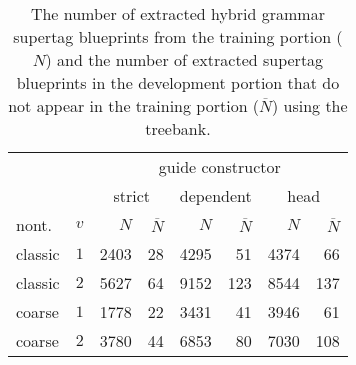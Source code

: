 \documentclass[../../document.tex]{subfiles}
\begin{document}
    \begin{table}
        \caption{\label{tbl:experiments:dptb:size}
        The number of extracted hybrid grammar supertag blueprints from the training portion ($N$) and the number of extracted supertag blueprints in the development portion that do not appear in the training portion ($\overline{N}$) using the \dptb{} treebank.
        }
        \centering
        \vspace{.2cm}
        \begin{tabular}{lc|rr|rr|rr}
            \toprule
                && \multicolumn{6}{c}{guide constructor}\\
             &        & \multicolumn{2}{c|}{strict} & \multicolumn{2}{c|}{dependent} & \multicolumn{2}{c}{head}  \\
 nont.   &\(v\)   & $N$ & $\overline{N}$ & $N$ & $\overline{N}$ & $N$ & $\overline{N}$ \\ \hline
  classic & \(1\)  & 2403 &  28 &  4295 &  51 &  4374 &  66  \\
  classic & \(2\)  & 5627 &  64 &  9152 & 123 &  8544 & 137  \\
  coarse  & \(1\)  & 1778 &  22 &  3431 &  41 &  3946 &  61  \\
  coarse  & \(2\)  & 3780 &  44 &  6853 &  80 &  7030 & 108  \\
    \bottomrule
        \end{tabular}
    \end{table}
\end{document}
